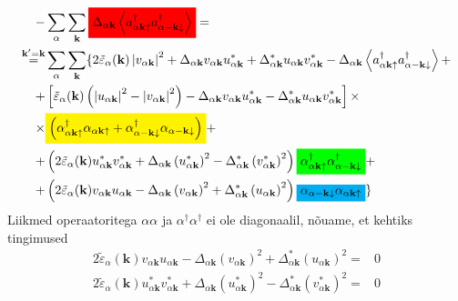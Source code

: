 \documentclass[class=article, crop=false]{standalone}
\newcommand{\mathcolorbox}[2]{\colorbox{#1}{$\displaystyle #2$}}
\begin{document}
\begin{equation}
\begin{split}
		- & \sum_{ \alpha} \sum_{ \mathbf{k}} \mathcolorbox{red}{ \Delta_{ \alpha \mathbf{k}} \left\langle a^{ \dagger}_{ \alpha \mathbf{k} \uparrow} a^{ \dagger}_{ \alpha -\mathbf{k} \downarrow} \right\rangle} = \\
		\overset{ \mathbf{k}' = \mathbf{k}}{=} & \sum_{ \alpha} \sum_{ \mathbf{k}} \lbrace 2 \tilde{ \varepsilon}_{ \alpha} ( \mathbf{k}) \left| v_{ \alpha \mathbf{k}} \right|^{2} + \Delta_{ \alpha \mathbf{k}} v_{ \alpha \mathbf{k}} u_{ \alpha \mathbf{k}}^{ \ast} + \Delta_{ \alpha \mathbf{k}}^{ \ast} u_{ \alpha \mathbf{k}} v_{ \alpha \mathbf{k}}^{ \ast} - \Delta_{ \alpha \mathbf{k}} \left\langle a^{ \dagger}_{ \alpha \mathbf{k} \uparrow} a^{ \dagger}_{ \alpha -\mathbf{k} \downarrow} \right\rangle + \\
		+ & \left[ \tilde{ \varepsilon}_{ \alpha} ( \mathbf{k}) \left( \left| u_{ \alpha \mathbf{k}} \right|^{2} - \left| v_{ \alpha \mathbf{k}} \right|^{2} \right) - \Delta_{ \alpha \mathbf{k}} v_{ \alpha \mathbf{k}} u_{ \alpha \mathbf{k}}^{ \ast} - \Delta_{ \alpha \mathbf{k}}^{ \ast} u_{ \alpha \mathbf{k}} v_{ \alpha \mathbf{k}}^{ \ast} \right] \times \\
		\times & \mathcolorbox{yellow}{ \left( \alpha_{ \alpha \mathbf{k} \uparrow}^{ \dagger} \alpha_{ \alpha \mathbf{k} \uparrow} + \alpha_{ \alpha - \mathbf{k} \downarrow}^{ \dagger} \alpha_{ \alpha - \mathbf{k} \downarrow} \right)} + \\
		+ & \left( 2 \tilde{ \varepsilon}_{ \alpha} ( \mathbf{k}) u_{ \alpha \mathbf{k}}^{ \ast} v_{ \alpha \mathbf{k}}^{ \ast} + \Delta_{ \alpha \mathbf{k}} \left( u_{ \alpha \mathbf{k}}^{ \ast} \right)^{2} - \Delta_{ \alpha \mathbf{k}}^{ \ast} \left( v_{ \alpha \mathbf{k}}^{ \ast} \right)^{2} \right) \mathcolorbox{green}{ \alpha_{ \alpha \mathbf{k} \uparrow}^{ \dagger} \alpha_{ \alpha - \mathbf{k} \downarrow}^{ \dagger}} + \\
		+ & \left( 2 \tilde{ \varepsilon}_{ \alpha} ( \mathbf{k}) v_{ \alpha \mathbf{k}} u_{ \alpha \mathbf{k}} - \Delta_{ \alpha \mathbf{k}} \left( v_{ \alpha \mathbf{k}} \right)^{2} + \Delta_{ \alpha \mathbf{k}}^{ \ast} \left( u_{ \alpha \mathbf{k}} \right)^{2} \right) \mathcolorbox{cyan}{ \alpha_{ \alpha - \mathbf{k} \downarrow} \alpha_{ \alpha \mathbf{k} \uparrow}} \rbrace
	\end{split}
\end{equation}
Liikmed operaatoritega $ \alpha \alpha $ ja $ \alpha^{ \dagger} \alpha^{ \dagger} $ ei ole diagonaalil, nõuame, et kehtiks tingimused
\begin{equation}\label{Mittediagonaalil}
	\begin{split}
		2 \tilde{ \varepsilon}_{ \alpha} ( \mathbf{k}) v_{ \alpha \mathbf{k}} u_{ \alpha \mathbf{k}} - \Delta_{ \alpha \mathbf{k}} \left( v_{ \alpha \mathbf{k}} \right)^{2} + \Delta_{ \alpha \mathbf{k}}^{ \ast} \left( u_{ \alpha \mathbf{k}} \right)^{2} = & 0 \\
		2 \tilde{ \varepsilon}_{ \alpha} ( \mathbf{k}) u_{ \alpha \mathbf{k}}^{ \ast} v_{ \alpha \mathbf{k}}^{ \ast} + \Delta_{ \alpha \mathbf{k}} \left( u_{ \alpha \mathbf{k}}^{ \ast} \right)^{2} - \Delta_{ \alpha \mathbf{k}}^{ \ast} \left( v_{ \alpha \mathbf{k}}^{ \ast} \right)^{2} = & 0
	\end{split}
\end{equation}
\end{document}
